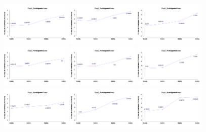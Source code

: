 \documentclass[a4paper ]{article}
\begin{document}
\begin{figure}[th]
\centering
\includegraphics[width=0.3\textwidth]{Figures/MirrorRating_Exp2_P1} \includegraphics[width=0.3\textwidth]{Figures/MirrorRating_Exp2_P2} \includegraphics[width=0.3\textwidth]{Figures/MirrorRating_Exp2_P3}
\includegraphics[width=0.3\textwidth]{Figures/MirrorRating_Exp2_P4} \includegraphics[width=0.3\textwidth]{Figures/MirrorRating_Exp2_P5} \includegraphics[width=0.3\textwidth]{Figures/MirrorRating_Exp2_P6}
\includegraphics[width=0.3\textwidth]{Figures/MirrorRating_Exp2_P7} \includegraphics[width=0.3\textwidth]{Figures/MirrorRating_Exp2_P8} \includegraphics[width=0.3\textwidth]{Figures/MirrorRating_Exp2_P9}

\end{figure}
\end{document}
